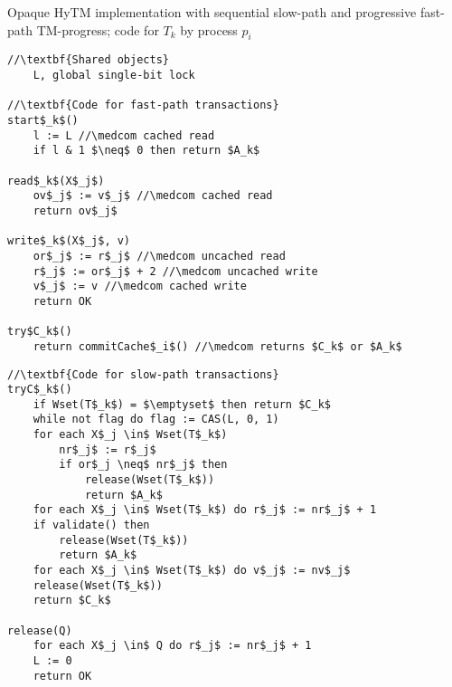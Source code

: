 \begin{algorithm*}[!ht]
\caption{Opaque HyTM implementation with sequential slow-path and progressive fast-path TM-progress; code for $T_k$ by process $p_i$}
\label{alg:inswrite2}
\vspace{-1mm}
\noindent\lstset{style=customc}
\begin{minipage}{0.49\textwidth}
\begin{lstlisting}[frame=none,firstnumber=1,mathescape=true]
//\textbf{Shared objects}
    L, global single-bit lock

//\textbf{Code for fast-path transactions}
start$_k$()
    l := L //\medcom cached read
    if l & 1 $\neq$ 0 then return $A_k$

read$_k$(X$_j$)
    ov$_j$ := v$_j$ //\medcom cached read
    return ov$_j$

write$_k$(X$_j$, v)
    or$_j$ := r$_j$ //\medcom uncached read
    r$_j$ := or$_j$ + 2 //\medcom uncached write
    v$_j$ := v //\medcom cached write
    return OK

try$C_k$()
    return commitCache$_i$() //\medcom returns $C_k$ or $A_k$
\end{lstlisting}
\end{minipage}
\begin{minipage}{0.49\textwidth}
\begin{lstlisting}[frame=none,firstnumber=last,mathescape=true]
//\textbf{Code for slow-path transactions}
tryC$_k$()
    if Wset(T$_k$) = $\emptyset$ then return $C_k$
    while not flag do flag := CAS(L, 0, 1)
    for each X$_j \in$ Wset(T$_k$)
        nr$_j$ := r$_j$
        if or$_j \neq$ nr$_j$ then
            release(Wset(T$_k$))
            return $A_k$
    for each X$_j \in$ Wset(T$_k$) do r$_j$ := nr$_j$ + 1
    if validate() then
        release(Wset(T$_k$))
        return $A_k$
    for each X$_j \in$ Wset(T$_k$) do v$_j$ := nv$_j$
    release(Wset(T$_k$))
    return $C_k$
    
release(Q)
    for each X$_j \in$ Q do r$_j$ := nr$_j$ + 1
    L := 0
    return OK
\end{lstlisting}
\end{minipage}
\vspace{-1mm}
\end{algorithm*}
